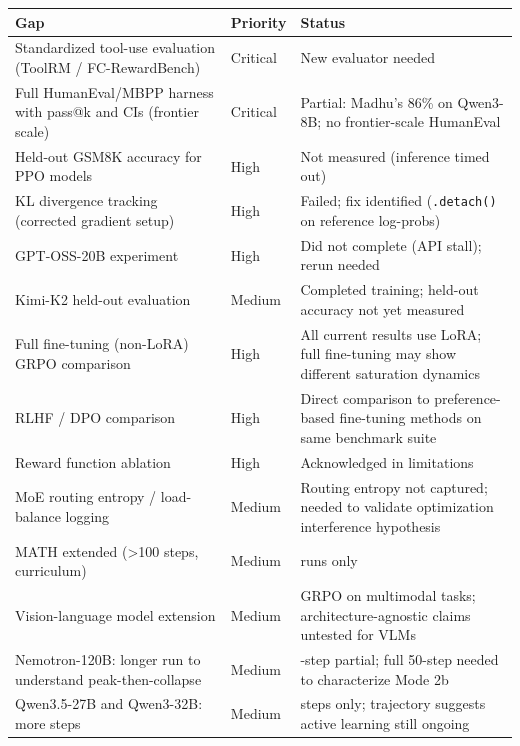 \documentclass[
  american,
  11pt,
  a4paper,
  oneside]{report}
\newcounter{none} %
\begin{document}
{\def\LTcaptype{none} %
\begin{longtable}[]{@{}
  >{\raggedright\arraybackslash}p{}
  >{\raggedright\arraybackslash}p{}
  >{\raggedright\arraybackslash}p{}@{}}
\toprule\noalign{}
\begin{minipage}[b]{\linewidth}\raggedright
Gap
\end{minipage} & \begin{minipage}[b]{\linewidth}\raggedright
Priority
\end{minipage} & \begin{minipage}[b]{\linewidth}\raggedright
Status
\end{minipage} \\
\midrule\noalign{}
\endhead
\bottomrule\noalign{}
\endlastfoot
Standardized tool-use evaluation (ToolRM / FC-RewardBench) & Critical &
New evaluator needed \\
Full HumanEval/MBPP harness with pass@k and CIs (frontier scale) &
Critical & Partial: Madhu's 86\% on Qwen3-8B; no frontier-scale
HumanEval \\
Held-out GSM8K accuracy for PPO models & High & Not measured (inference
timed out) \\
KL divergence tracking (corrected gradient setup) & High & Failed; fix
identified (\texttt{.detach()} on reference log-probs) \\
GPT-OSS-20B experiment & High & Did not complete (API stall); rerun
needed \\
Kimi-K2 held-out evaluation & Medium & Completed training; held-out
accuracy not yet measured \\
Full fine-tuning (non-LoRA) GRPO comparison & High & All current results
use LoRA; full fine-tuning may show different saturation dynamics \\
RLHF / DPO comparison & High & Direct comparison to preference-based
fine-tuning methods on same benchmark suite \\
Reward function ablation & High & Acknowledged in limitations \\
MoE routing entropy / load-balance logging & Medium & Routing entropy
not captured; needed to validate optimization interference hypothesis \\
MATH extended (\textgreater100 steps, curriculum) & Medium & 2 runs
only \\
Vision-language model extension & Medium & GRPO on multimodal tasks;
architecture-agnostic claims untested for VLMs \\
Nemotron-120B: longer run to understand peak-then-collapse & Medium &
20-step partial; full 50-step needed to characterize Mode 2b \\
Qwen3.5-27B and Qwen3-32B: more steps & Medium & 10 steps only;
trajectory suggests active learning still ongoing \\
\end{longtable}
}
\end{document}
